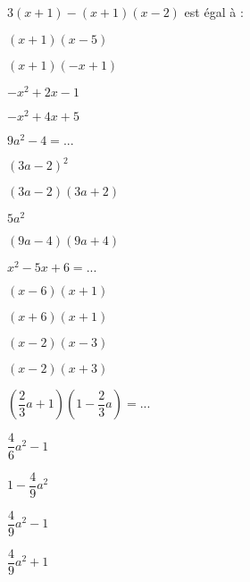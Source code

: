 



\begin{QCM}
  \begin{GroupeQCM} 

    \begin{exercice}
      $3(x+1)-(x+1)(x-2)$ est égal à :
      \begin{ChoixQCM}{4}
      \item $(x+1)(x-5)$
      \item $(x+1)(-x+1)$
      \item $-x^2+2x-1$
      \item $-x^2+4x+5$
      \end{ChoixQCM}
     \begin{corrige}
  \end{corrige}
   \end{exercice} 



    \begin{exercice}
      $9a^2-4=...$
      \begin{ChoixQCM}{4}
      \item $(3a-2)^2$
      \item $(3a-2)(3a+2)$
      \item $5a^2$
      \item $(9a-4)(9a+4)$
      \end{ChoixQCM}
      \begin{corrige}
   \end{corrige}
    \end{exercice}
    
    
     \begin{exercice}
      $x^2-5x+6=...$
      \begin{ChoixQCM}{4}
      \item $(x-6)(x+1)$
      \item $(x+6)(x+1)$
      \item $(x-2)(x-3)$
      \item $(x-2)(x+3)$
      \end{ChoixQCM}
      \begin{corrige}
   \end{corrige}
    \end{exercice}
    
     \begin{exercice}
      $\left( \dfrac{2}{3}a+1\right) \left( 1-\dfrac{2}{3}a\right) =...$
      \begin{ChoixQCM}{4}
      \item $\dfrac{4}{6}a^2-1$
      \item $1-\dfrac{4}{9}a^2$
      \item $\dfrac{4}{9}a^2-1$
      \item $\dfrac{4}{9}a^2+1$
      \end{ChoixQCM}
      \begin{corrige}
   \end{corrige}
    \end{exercice}
    

\end{GroupeQCM}
\end{QCM}
